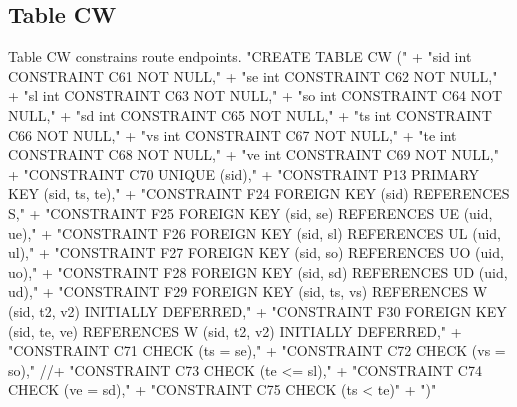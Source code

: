 \subsection{Table CW}
Table CW constrains route endpoints.
\nwenddocs{}\endmoddef{}
"CREATE TABLE CW ("
  + "sid int  CONSTRAINT C61 NOT NULL,"
  + "se  int  CONSTRAINT C62 NOT NULL,"
  + "sl  int  CONSTRAINT C63 NOT NULL,"
  + "so  int  CONSTRAINT C64 NOT NULL,"
  + "sd  int  CONSTRAINT C65 NOT NULL,"
  + "ts  int  CONSTRAINT C66 NOT NULL,"
  + "vs  int  CONSTRAINT C67 NOT NULL,"
  + "te  int  CONSTRAINT C68 NOT NULL,"
  + "ve  int  CONSTRAINT C69 NOT NULL,"
  + "CONSTRAINT C70 UNIQUE (sid),"
  + "CONSTRAINT P13 PRIMARY KEY (sid, ts, te),"
  + "CONSTRAINT F24 FOREIGN KEY (sid) REFERENCES S,"
  + "CONSTRAINT F25 FOREIGN KEY (sid, se) REFERENCES UE (uid, ue),"
  + "CONSTRAINT F26 FOREIGN KEY (sid, sl) REFERENCES UL (uid, ul),"
  + "CONSTRAINT F27 FOREIGN KEY (sid, so) REFERENCES UO (uid, uo),"
  + "CONSTRAINT F28 FOREIGN KEY (sid, sd) REFERENCES UD (uid, ud),"
  + "CONSTRAINT F29 FOREIGN KEY (sid, ts, vs) REFERENCES W (sid, t2, v2) INITIALLY DEFERRED,"
  + "CONSTRAINT F30 FOREIGN KEY (sid, te, ve) REFERENCES W (sid, t2, v2) INITIALLY DEFERRED,"
  + "CONSTRAINT C71 CHECK (ts = se),"
  + "CONSTRAINT C72 CHECK (vs = so),"
//+ "CONSTRAINT C73 CHECK (te <= sl),"
  + "CONSTRAINT C74 CHECK (ve = sd),"
  + "CONSTRAINT C75 CHECK (ts < te)"
  + ")"
\nwendcode{}\nwdocspar


